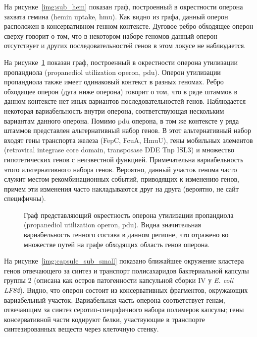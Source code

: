 На рисунке~\ref{img:sub_hem} показан граф, построенный в окрестности оперона захвата гемина (hemin uptake, hmu). Как видно из графа, данный оперон расположен в консервативном генном контексте. Дуговое ребро обходящее оперон сверху говорит о том, что в некотором наборе геномов данный оперон отсутствует и других последовательностей генов в этом локусе не наблюдается. 

На рисунке~\ref{img:sub_pdu} показан граф, построенный в окрестности оперона утилизации пропандиола (propanediol utilization operon, pdu). Оперон утилизации пропандиола также имеет одинаковый контекст в разных геномах. Ребро обходящее оперон (дуга ниже оперона) говорит о том, что в ряде штаммов в данном контексте нет иных вариантов последовательностей генов. Наблюдается некоторая вариабельность внутри оперона, соответствующая нескольким вариантам данного оперона. Помимо pdu оперона, в том же контексте у ряда штаммов представлен альтернативный набор генов. В этот альтернативный набор входят гены транспорта железа (FepC, FcuA, HmuU), гены мобильных элементов (retroviral integrase core domain, transposase DDE Tnp ISL3) и множество гипотетических генов с неизвестной функцией. Примечательна вариабельность этого альтернативного набора генов. Вероятно, данный участок генома часто служит местом рекомбинационных событий, приводящих к изменению генов, причем эти изменения часто накладываются друг на друга (вероятно, не сайт специфичны). 


\begin{figure}[!ht] 
  \center
  \setlength{\fboxsep}{10pt}%
  \setlength{\fboxrule}{0pt}%
  \caption{Граф представляющий окрестность оперона утилизации пропандиола (propanediol utilization operon, pdu). Видна значительная вариабельность генного состава в данном регионе, что отражено во множестве путей на графе обходящих область генов оперона.}
  \label{img:sub_pdu} 
\end{figure}

На рисунке~\ref{img:capsule_sub_small} показано ближайшее окружение кластера генов отвечающего за синтез и транспорт полисахаридов бактериальной капсулы группы 2 (описана как остров патогенности капсульной сборки IV у \textit{E. coli LF82}). Видно, что оперон состоит из консервативных фрагментов, окружающих вариабельный участок. Вариабельная часть оперона соответствует генам, отвечающим за синтез серотип-специфичного набора полимеров капсулы; гены консервативной части кодируют белки, участвующие в транспорте синтезированных веществ через клеточную стенку.


